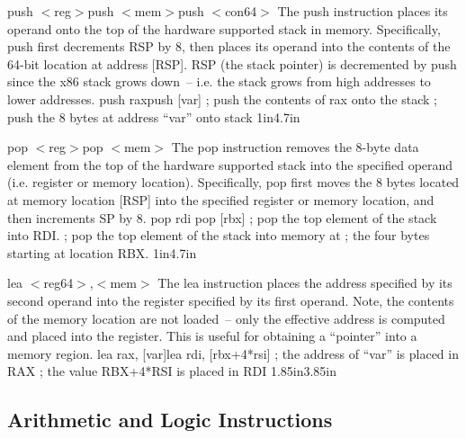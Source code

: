 {push $<$reg$>$\newline push $<$mem$>$\newline push $<$con64$>$}
{The push instruction places its operand onto the top of the hardware supported
stack in memory. Specifically, push first decrements RSP by 8, then places its
operand into the contents of the 64-bit location at address [RSP]. RSP (the stack
pointer) is decremented by push since the x86 stack grows down~-- i.e. the stack
grows from high addresses to lower addresses.}
{push rax\newline push [var]}
{; push the contents of rax onto the stack\newline
; push the 8 bytes at address ``var'' onto stack}
{1in}{4.7in}

{pop $<$reg$>$\newline pop $<$mem$>$}
{The pop instruction removes the 8-byte data element from the top of
  the hardware supported stack into the specified operand (i.e.
  register or memory location). Specifically, pop first moves the 8
  bytes located at memory location [RSP] into the specified register or
  memory location, and then increments SP by 8.}
{pop rdi \newline pop [rbx]}
{; pop the top element of the stack into RDI.\newline
; pop the top element of the stack into memory at\newline
; the four bytes starting at location RBX.}
{1in}{4.7in}

{lea $<$reg64$>$,$<$mem$>$}
{The lea instruction places the address specified by its second
  operand into the register specified by its first operand. Note, the
  contents of the memory location are not loaded~-- only the effective
  address is computed and placed into the register.  This is useful
  for obtaining a ``pointer'' into a memory region.}
{lea rax, [var]\newline lea rdi, [rbx+4*rsi]}
{; the address of ``var'' is placed in RAX \newline
; the value RBX+4*RSI is placed in RDI}
{1.85in}{3.85in}

\subsection{Arithmetic and Logic Instructions}

